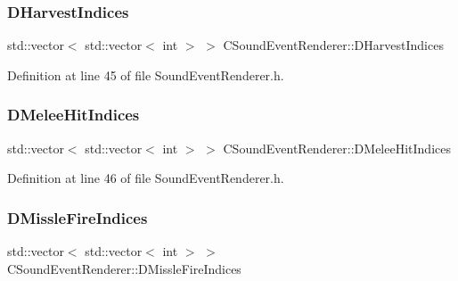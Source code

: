 \hypertarget{classCSoundEventRenderer_abe64071cbc49cffab8a5c6160b7f821d}{}\label{classCSoundEventRenderer_abe64071cbc49cffab8a5c6160b7f821d} 
\subsubsection{\texorpdfstring{D\+Harvest\+Indices}{DHarvestIndices}}
{\footnotesize\ttfamily std\+::vector$<$ std\+::vector$<$ int $>$ $>$ C\+Sound\+Event\+Renderer\+::\+D\+Harvest\+Indices\hspace{0.3cm}{\ttfamily [protected]}}



Definition at line 45 of file Sound\+Event\+Renderer.\+h.

\hypertarget{classCSoundEventRenderer_a54a3a8f6a91adcaa81faa779772622da}{}\label{classCSoundEventRenderer_a54a3a8f6a91adcaa81faa779772622da} 
\subsubsection{\texorpdfstring{D\+Melee\+Hit\+Indices}{DMeleeHitIndices}}
{\footnotesize\ttfamily std\+::vector$<$ std\+::vector$<$ int $>$ $>$ C\+Sound\+Event\+Renderer\+::\+D\+Melee\+Hit\+Indices\hspace{0.3cm}{\ttfamily [protected]}}



Definition at line 46 of file Sound\+Event\+Renderer.\+h.

\hypertarget{classCSoundEventRenderer_ab781b03b940441c7d23fe1d6031d773e}{}\label{classCSoundEventRenderer_ab781b03b940441c7d23fe1d6031d773e} 
\subsubsection{\texorpdfstring{D\+Missle\+Fire\+Indices}{DMissleFireIndices}}
{\footnotesize\ttfamily std\+::vector$<$ std\+::vector$<$ int $>$ $>$ C\+Sound\+Event\+Renderer\+::\+D\+Missle\+Fire\+Indices\hspace{0.3cm}{\ttfamily [protected]}}



